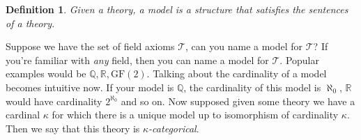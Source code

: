 \documentclass{article}
\newtheorem{defn}{Definition}
\begin{document}
\begin{defn}
  Given a theory, a model is a structure that satisfies the sentences of a
  theory.
\end{defn}

Suppose we have the set of field axioms $\mathcal{T}$, can you name a model for
$\mathcal{T}$? If you're familiar with \textit{any} field, then you can name a
model for $\mathcal{T}$. Popular examples would be $\mathbb{Q},
\mathbb{R},\text{GF}(2)$. Talking about the cardinality of a model becomes
intuitive now. If your model is $\mathbb{Q}$, the cardinality of this model is $\aleph_{0}$, $\mathbb{R}$ would
have cardinality $2^{\aleph_{0}}$ and so on. Now supposed given some theory we
have a cardinal $\kappa$ for which there is a unique model up to isomorphism of
cardinality $\kappa$. Then we say that this theory is $\kappa$\textit{-categorical}.
\end{document}
